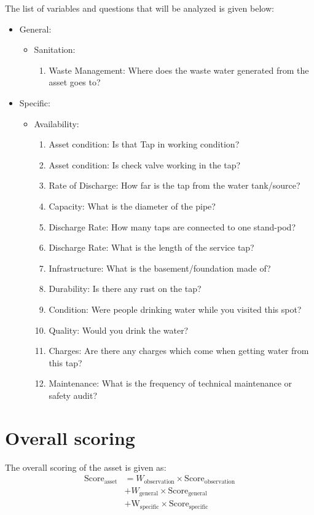 \documentclass[oneside,twocolumn]{article}
\newcommand{\tsub}[2]{\text{#1}_{\text{#2}}}
\newcommand{\tsubb}[2]{#1_{\text{#2}}}
\begin{document}
The list of variables and questions that will be analyzed is given below:
\begin{itemize}
	\item General:
		\begin{itemize}
			\item Sanitation:
				\begin{enumerate}
					\item Waste Management: Where does the waste water generated from the asset goes to?
				\end{enumerate}
		\end{itemize}
	\item Specific:
		\begin{itemize}
			\item Availability:
				\begin{enumerate}
					\item Asset condition: Is that Tap in working condition?
					\item Asset condition: Is check valve working in the tap?
					\item Rate of Discharge: How far is the tap from the water tank/source?
					\item Capacity: What is the diameter of the pipe?
					\item Discharge Rate: How many taps are connected to one stand-pod?
					\item Discharge Rate: What is the length of the service tap?
					\item Infrastructure: What is the basement/foundation made of?
					\item Durability: Is there any rust on the tap?
					\item Condition: Were people drinking water while you visited this spot?
					\item Quality: Would you drink the water?
					\item Charges: Are there any charges which come when getting water from this tap?
					\item Maintenance: What is the frequency of technical maintenance or safety audit? 
				\end{enumerate}
		\end{itemize}
\end{itemize}

\section{Overall scoring}
The overall scoring of the asset is given as:
\begin{align*}
	\tsub{Score}{asset} &= \tsubb{W}{observation} \times \tsub{Score}{observation} \\
	&+\tsubb{W}{general} \times \tsub{Score}{general} \\
	&+ \tsub{W}{specific} \times \tsub{Score}{specific}
\end{align*}
\end{document}
